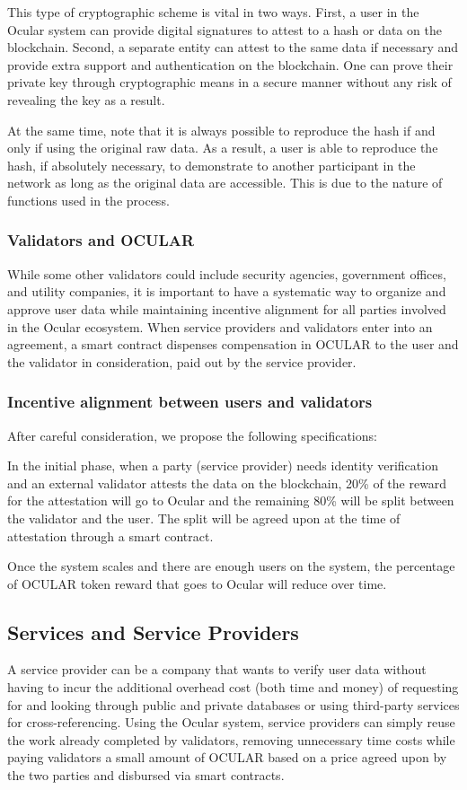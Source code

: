 \documentclass[a4paper]{article}
\let\tempone\itemize
\let\temptwo\enditemize
\renewenvironment{itemize}{\tempone\addtolength{\itemsep}{-5pt}}{\temptwo}
\begin{document}
This type of cryptographic scheme is vital in two ways. First, a user in the Ocular system can provide digital signatures to attest to a hash or data on the blockchain. Second, a separate entity can attest to the same data if necessary and provide extra support and authentication on the blockchain. One can prove their private key through cryptographic means in a secure manner without any risk of revealing the key as a result.

At the same time, note that it is always possible to reproduce the hash if and only if using the original raw data. As a result, a user is able to reproduce the hash, if absolutely necessary, to demonstrate to another participant in the network as long as the original data are accessible. This is due to the nature of functions used in the process.

\subsubsection*{Validators and OCULAR}
While some other validators could include security agencies, government offices, and utility companies, it is important to have a systematic way to organize and approve user data while maintaining incentive alignment for all parties involved in the Ocular ecosystem. When service providers and validators enter into an agreement, a smart contract dispenses compensation in OCULAR to the user and the validator in consideration, paid out by the service provider. 
\subsubsection* {Incentive alignment between users and validators}
After careful consideration, we propose the following specifications:
\begin{itemize}
\item In the initial phase, when a party (service provider) needs identity verification and an external validator attests the data on the blockchain, 20\% of the reward for the attestation will go to Ocular and the remaining 80\% will be split between the validator and the user. The split will be agreed upon at the time of attestation through a smart contract. 
\item Once the system scales and there are enough users on the system, the percentage of OCULAR token reward that goes to Ocular will reduce over time. 
\end{itemize}

\subsection{Services and Service Providers}
A service provider can be a company that wants to verify user data without having to incur the additional overhead cost (both time and money) of requesting for and looking through public and private databases or using third-party services for cross-referencing. Using the Ocular system, service providers can simply reuse the work already completed by validators, removing unnecessary time costs while paying validators a small amount of OCULAR based on a price agreed upon by the two parties and disbursed via smart contracts.
\end{document}
